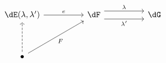\[\begin{tikzcd}
	{\dE(\lambda,\lambda')} && \dF && \dG \\
	\\
	\bullet
	\arrow["\lambda", shift left=2, from=1-3, to=1-5]
	\arrow["{\lambda'}"', shift right=2, from=1-3, to=1-5]
	\arrow["e", from=1-1, to=1-3]
	\arrow["F"', from=3-1, to=1-3]
	\arrow[dashed, from=3-1, to=1-1]
\end{tikzcd}\]